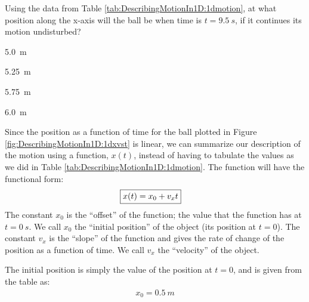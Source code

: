 \begin{checkpoint}
\begin{MCquestion}{Using the data from Table \ref{tab:DescribingMotionIn1D:1dmotion}, at what position along the x-axis will the ball be when time is $t=\SI{9.5}{s}$, if it continues its motion undisturbed?} 
\item \SI{5.0}{m}
\item \SI{5.25}{m}\correct
\item \SI{5.75}{m}
\item \SI{6.0}{m}
\end{MCquestion}
\end{checkpoint} 

Since the position as a function of time for the ball plotted in Figure \ref{fig:DescribingMotionIn1D:1dxvst} is linear, we can summarize our description of the motion using a function, $x(t)$, instead of having to tabulate the values as we did in Table \ref{tab:DescribingMotionIn1D:1dmotion}. The function will have the functional form:
\begin{align}
\label{eqn:DescribingMotionIn1D:1dxvst_noa}
\Aboxed{x(t) = x_0 + v_x t}
\end{align}
The constant $x_0$ is the ``offset'' of the function; the value that the function has at $t=\SI{0}{s}$. We call $x_0$ the ``initial position'' of the object (its position at $t=0$). The constant $v_x$ is the ``slope'' of the function and gives the rate of change of the position as a function of time. We call $v_x$ the ``velocity'' of the object.

The initial position is simply the value of the position at $t=0$, and is given from the table as:
\begin{align*}
x_0 = \SI{0.5}{m}
\end{align*}


